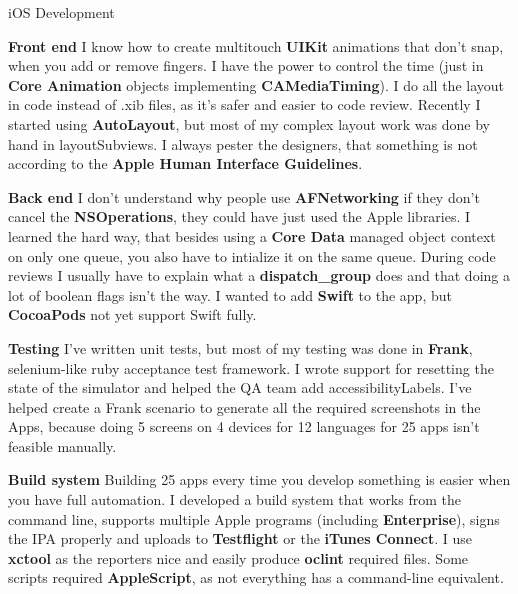 \documentclass[letterpaper]{article}
\renewenvironment{itemize}{
  \begin{list}{}{
    \setlength{\leftmargin}{1.5em}
  }
}{
  \end{list}
}
\begin{document}
\begin{itemize}
	\item iOS Development \begin{itemize}

		\item {\bf Front end} I know how to create multitouch {\bf UIKit} animations that don't snap, when you add or remove fingers. I have the power to control the time (just in {\bf Core Animation} objects implementing {\bf CAMediaTiming}). I do all the layout in code instead of .xib files, as it's safer and easier to code review. Recently I started using {\bf AutoLayout}, but most of my complex layout work was done by hand in layoutSubviews. I always pester the designers, that something is not according to the {\bf Apple Human Interface Guidelines}.
		
		\item {\bf Back end} I don't understand why people use {\bf AFNetworking} if they don't cancel the {\bf NSOperations}, they could have just used the Apple libraries. I learned the hard way, that besides using a {\bf Core Data} managed object context on only one queue, you also have to intialize it on the same queue. During code reviews I usually have to explain what a {\bf dispatch\_group} does and that doing a lot of boolean flags isn't the way. I wanted to add {\bf Swift} to the app, but {\bf CocoaPods} not yet support Swift fully.
		
		\item {\bf Testing} I've written unit tests, but most of my testing was done in {\bf Frank}, selenium-like ruby acceptance test framework. I wrote support for resetting the state of the simulator and helped the QA team add accessibilityLabels. I've helped create a Frank scenario to generate all the required screenshots in the Apps, because doing 5 screens on 4 devices for 12 languages for 25 apps isn't feasible manually.
		
		\item {\bf Build system} Building 25 apps every time you develop something is easier when you have full automation. I developed a build system that works from the command line, supports multiple Apple programs (including {\bf Enterprise}), signs the IPA properly and uploads to {\bf Testflight} or the {\bf iTunes Connect}. I use {\bf xctool} as the reporters nice and easily produce {\bf oclint} required files. Some scripts required {\bf AppleScript}, as not everything has a command-line equivalent.

	\end{itemize}	


\end{itemize}
\end{document}
